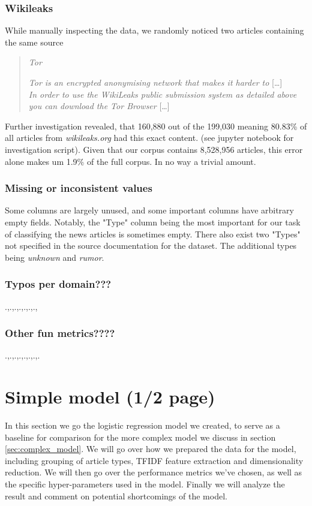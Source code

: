 \documentclass{article}
\begin{document}
\subsubsection{Wikileaks}
While manually inspecting the data, we randomly noticed two articles containing the same source
\begin{quote}
    \textit{Tor}

    \textit{Tor is an encrypted anonymising network that makes it harder to} [\dots]\\
    \textit{In order to use the WikiLeaks public submission system as detailed above you can download the Tor Browser} [\dots]
\end{quote}
Further investigation revealed, that 160,880 out of the 199,030 meaning 80.83\% of all articles from \emph{wikileaks.org} had this exact content. (see jupyter notebook for investigation script). Given that our corpus contains 8,528,956 articles, this error alone makes um 1.9\% of the full corpus. In no way a trivial amount.
\subsubsection{Missing or inconsistent values}
Some columns are largely unused, and some important columns have arbitrary empty fields. Notably, the "Type" column being the most important for our task of classifying the news articles is sometimes empty. There also exist two "Types" not specified in the source documentation for the dataset. The additional types being \emph{unknown} and \emph{rumor}.
\subsubsection{Typos per domain???}
.,.,.,.,.,.,.,
\subsubsection{Other fun metrics????}
.,.,.,.,.,.,.,.
\newpage

\section{Simple model (1/2 page)} 
In this section we go the logistic regression model we created, to serve as a baseline for comparison for the more
complex model we discuss in section \ref{sec:complex_model}. We will go over how we prepared the data for the model,
including grouping of article types, TFIDF feature extraction and dimensionality reduction. We will then go over the
performance metrics we've chosen, as well as the specific hyper-parameters used in the model. Finally we will analyze
the result and comment on potential shortcomings of the model. 
\end{document}
